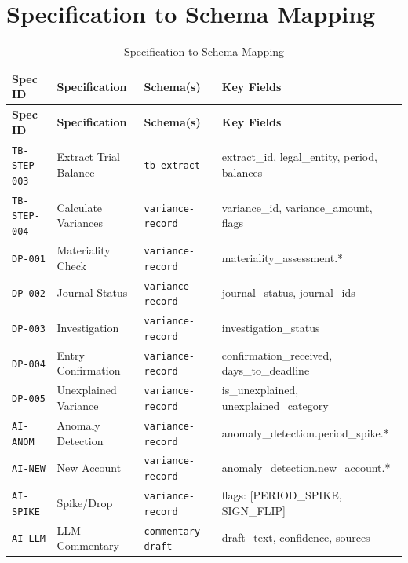 \documentclass[11pt,a4paper,twoside]{report}
\newcommand{\specref}[1]{\texttt{#1}}
\newcommand{\schemaref}[1]{\texttt{#1}}
\begin{document}
\section{Specification to Schema Mapping}
\label{sec:spec-schema-mapping}

\begin{longtable}{@{}C{2cm}L{4cm}C{3cm}L{4.5cm}@{}}
\caption{Specification to Schema Mapping}
\label{tab:spec-schema-mapping} \\
\toprule
\textbf{Spec ID} & \textbf{Specification} & \textbf{Schema(s)} & \textbf{Key Fields} \\
\midrule
\endfirsthead
\toprule
\textbf{Spec ID} & \textbf{Specification} & \textbf{Schema(s)} & \textbf{Key Fields} \\
\midrule
\endhead
\specref{TB-STEP-003} & Extract Trial Balance & \schemaref{tb-extract} & extract\_id, legal\_entity, period, balances \\
\specref{TB-STEP-004} & Calculate Variances & \schemaref{variance-record} & variance\_id, variance\_amount, flags \\
\specref{DP-001} & Materiality Check & \schemaref{variance-record} & materiality\_assessment.* \\
\specref{DP-002} & Journal Status & \schemaref{variance-record} & journal\_status, journal\_ids \\
\specref{DP-003} & Investigation & \schemaref{variance-record} & investigation\_status \\
\specref{DP-004} & Entry Confirmation & \schemaref{variance-record} & confirmation\_received, days\_to\_deadline \\
\specref{DP-005} & Unexplained Variance & \schemaref{variance-record} & is\_unexplained, unexplained\_category \\
\specref{AI-ANOM} & Anomaly Detection & \schemaref{variance-record} & anomaly\_detection.period\_spike.* \\
\specref{AI-NEW} & New Account & \schemaref{variance-record} & anomaly\_detection.new\_account.* \\
\specref{AI-SPIKE} & Spike/Drop & \schemaref{variance-record} & flags: [PERIOD\_SPIKE, SIGN\_FLIP] \\
\specref{AI-LLM} & LLM Commentary & \schemaref{commentary-draft} & draft\_text, confidence, sources \\
\bottomrule
\end{longtable}

\end{document}
